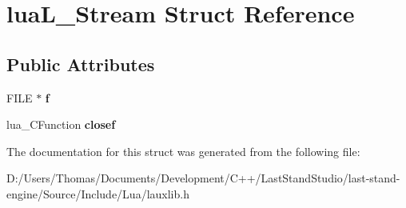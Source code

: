 \hypertarget{structluaL__Stream}{}\section{lua\+L\+\_\+\+Stream Struct Reference}
\label{structluaL__Stream}
\subsection*{Public Attributes}
\begin{DoxyCompactItemize}
\item 
\hypertarget{structluaL__Stream_a50fc81b2c6481ab7768e41bdd3793bab}{}F\+I\+L\+E $\ast$ {\bfseries f}\label{structluaL__Stream_a50fc81b2c6481ab7768e41bdd3793bab}

\item 
\hypertarget{structluaL__Stream_a98731a1b0b1e28336d7206798895e62f}{}lua\+\_\+\+C\+Function {\bfseries closef}\label{structluaL__Stream_a98731a1b0b1e28336d7206798895e62f}

\end{DoxyCompactItemize}


The documentation for this struct was generated from the following file\+:\begin{DoxyCompactItemize}
\item 
D\+:/\+Users/\+Thomas/\+Documents/\+Development/\+C++/\+Last\+Stand\+Studio/last-\/stand-\/engine/\+Source/\+Include/\+Lua/lauxlib.\+h\end{DoxyCompactItemize}
